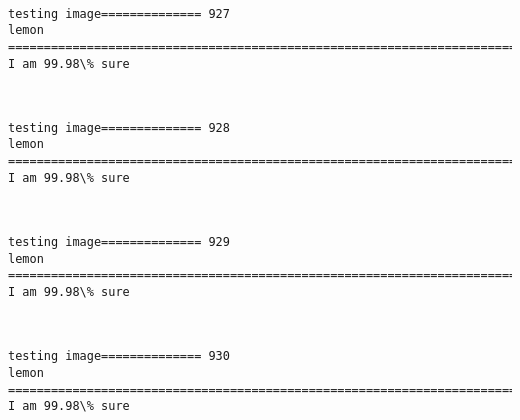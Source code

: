\documentclass[11pt]{article}
\begin{document}
    \begin{center}
    \end{center}
    { \hspace*{\fill} \\}
    
    \begin{Verbatim}[commandchars=\\\{\}]
testing image============== 927
lemon
============================================================================
I am 99.98\% sure

    \end{Verbatim}

    \begin{center}
    \end{center}
    { \hspace*{\fill} \\}
    
    \begin{Verbatim}[commandchars=\\\{\}]
testing image============== 928
lemon
============================================================================
I am 99.98\% sure

    \end{Verbatim}

    \begin{center}
    \end{center}
    { \hspace*{\fill} \\}
    
    \begin{Verbatim}[commandchars=\\\{\}]
testing image============== 929
lemon
============================================================================
I am 99.98\% sure

    \end{Verbatim}

    \begin{center}
    \end{center}
    { \hspace*{\fill} \\}
    
    \begin{Verbatim}[commandchars=\\\{\}]
testing image============== 930
lemon
============================================================================
I am 99.98\% sure

    \end{Verbatim}
\end{document}

